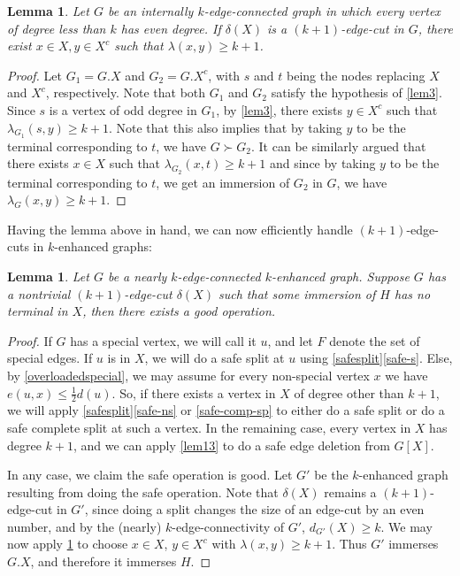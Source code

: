 \documentclass[letterpaper,11pt]{article}
\newtheorem{lemma}[theorem]{Lemma}
\theoremstyle{definition}
\begin{document}
\begin{lemma}
\label{lem4}
Let $G$ be an internally $k$-edge-connected graph in which every vertex of degree less than $k$ has even degree.
If $\delta (X)$ is a $(k+1)$-edge-cut in $G$, there exist $x \in X, y \in X^c$ such that $\lambda(x,y)\geq k+1$.
\end{lemma}

\begin{proof}
Let $G_1 = G.X$ and $G_2 = G.X^c$, with $s$ and $t$ being the nodes replacing $X$ and $X^c$, respectively. Note that both $G_1$ and $G_2$ satisfy the hypothesis of \cref{lem3}. Since $s$ is a vertex of odd degree in $G_1$, by \cref{lem3}, there exists $y \in X^c$ such that $\lambda_{G_1}(s, y)\geq k+1$. Note that this also implies that by taking $y$ to be the terminal corresponding to $t$, we have $G \succ G_2$. It can be similarly argued that there exists $x\in X$ such that $\lambda_{G_2}(x,t)\geq k+1$ and since by taking $y$ to be the terminal corresponding to $t$, we get an immersion of $G_2$ in $G$, we have $\lambda_G(x,y)\geq k+1$.
\end{proof}




Having the lemma above in hand, we can now efficiently handle $(k+1)$-edge-cuts in $k$-enhanced graphs:

\begin{lemma}
\label{lem5}
 Let $G$ be a nearly $k$-edge-connected $k$-enhanced graph. Suppose $G$ has a nontrivial $(k+1)$-edge-cut $\delta (X)$ such that some immersion of $H$ has no terminal in $X$, then there exists a good operation.
\end{lemma}



\begin{proof}
If $G$ has a special vertex, we will call it $u$, and let $F$ denote the set of special edges. If $u$ is in $X$, we will do a safe split at $u$ using \cref{safesplit}\ref{safe-s}.  Else,  by \cref{overloadedspecial}, we may assume for every non-special vertex $x$ we have $e(u,x) \le \frac{1}{2} d(u)$. So, if there exists a vertex in $X$ of degree other than $k+1$, we will apply \cref{safesplit}\ref{safe-ns} or \cref{safe-comp-sp} to either do a safe split or do a safe complete split at such a vertex. In the remaining case, every vertex in $X$ has degree $k+1$, and 
we can apply \cref{lem13} to do a safe edge deletion from $G[X]$.

In any case, we claim the safe operation is good. Let $G'$ be the $k$-enhanced graph resulting from doing the safe operation. Note that $\delta (X)$ remains a $(k+1)$-edge-cut in $G'$, since doing a split changes the size of an edge-cut by an even number, and by the (nearly) $k$-edge-connectivity of $G'$, $d_{G'}(X) \geq k$. We may now apply \cref{lem4} to choose $x \in X$, $y \in X^c$ with $\lambda(x,y) \geq k+1$. Thus $G'$ immerses $G.X$, and therefore it immerses $H$.
\end{proof}
\end{document}
